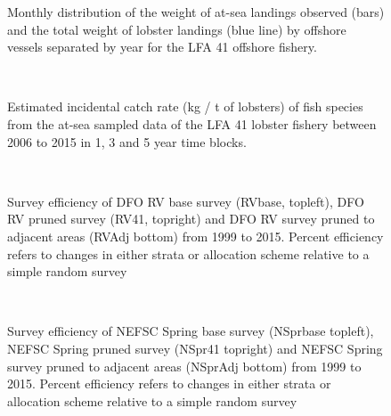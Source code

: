 \documentclass[11pt]{article}
\newcommand{\D}{.}
\newcommand{\e}{/backup/bio_data/bio.lobster/figures/} %
\begin{document}
\begin{figure}
        \centering
        \caption{Monthly distribution of the weight of at-sea landings observed  (bars) and the total weight of lobster landings (blue line) by offshore vessels separated by year for the LFA 41 offshore fishery. }
        \end{figure}
        \clearpage


\begin{landscape}
        \begin{figure}
        \centering
                \\
        \caption{Estimated incidental catch rate (kg / t of lobsters) of fish species from the at-sea sampled data of the LFA 41 lobster fishery between 2006 to 2015 in 1, 3 and 5 year time blocks.}
        \end{figure}
        \clearpage

\end{landscape}





        \begin{figure}
        \centering
                \\
        \caption{Survey efficiency of DFO RV base survey (RVbase, topleft), DFO RV pruned survey (RV41, topright) and DFO RV survey pruned to adjacent areas (RVAdj bottom) from 1999 to 2015. Percent efficiency refers to changes in either strata or allocation scheme relative to a simple random survey }
        \end{figure}
        \clearpage



        \begin{figure}
        \centering
                \\
        \caption{Survey efficiency of NEFSC Spring base survey (NSprbase topleft), NEFSC Spring pruned survey (NSpr41 topright) and NEFSC Spring survey pruned to adjacent areas (NSprAdj bottom) from 1999 to 2015. Percent efficiency refers to changes in either strata or allocation scheme relative to a simple random survey }
        \end{figure}
        \clearpage
\end{document}
